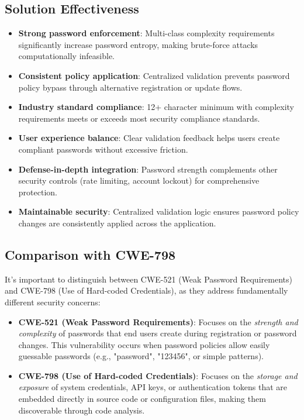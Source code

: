 \documentclass[]{UCD_CS_FYP_Report}
\begin{document}
\subsection{Solution Effectiveness}
\begin{itemize}
	\item \textbf{Strong password enforcement}: Multi-class complexity requirements significantly increase password entropy, making brute-force attacks computationally infeasible.
	\item \textbf{Consistent policy application}: Centralized validation prevents password policy bypass through alternative registration or update flows.
	\item \textbf{Industry standard compliance}: 12+ character minimum with complexity requirements meets or exceeds most security compliance standards.
	\item \textbf{User experience balance}: Clear validation feedback helps users create compliant passwords without excessive friction.
	\item \textbf{Defense-in-depth integration}: Password strength complements other security controls (rate limiting, account lockout) for comprehensive protection.
	\item \textbf{Maintainable security}: Centralized validation logic ensures password policy changes are consistently applied across the application.
\end{itemize}

\subsection{Comparison with CWE-798}
It's important to distinguish between CWE-521 (Weak Password Requirements) and CWE-798 (Use of Hard-coded Credentials), as they address fundamentally different security concerns:

\begin{itemize}
	\item \textbf{CWE-521 (Weak Password Requirements)}: Focuses on the \textit{strength and complexity} of passwords that end users create during registration or password changes. This vulnerability occurs when password policies allow easily guessable passwords (e.g., "password", "123456", or simple patterns).

	\item \textbf{CWE-798 (Use of Hard-coded Credentials)}: Focuses on the \textit{storage and exposure} of system credentials, API keys, or authentication tokens that are embedded directly in source code or configuration files, making them discoverable through code analysis.
\end{itemize}
\end{document}
